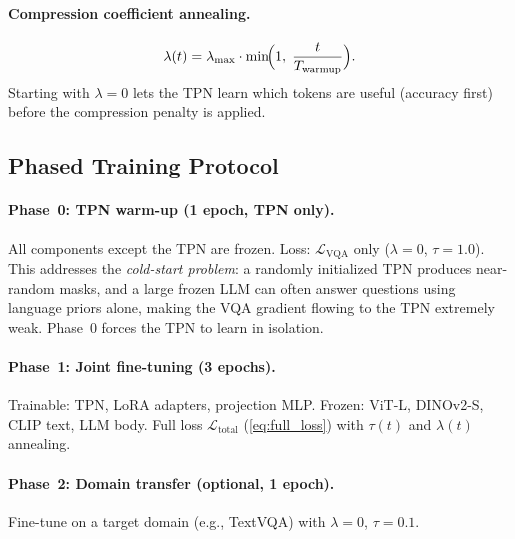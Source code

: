 \documentclass[11pt,a4paper]{article}
\begin{document}
\paragraph{Compression coefficient annealing.}
\begin{equation}
  \lambda(t) = \lambda_{\max}
    \cdot \min\!\Bigl(1,\;\frac{t}{T_{\mathrm{warmup}}}\Bigr).
  \label{eq:lambda_anneal}
\end{equation}
Starting with $\lambda{=}0$ lets the TPN learn which tokens are useful (accuracy
first) before the compression penalty is applied.

\subsection{Phased Training Protocol}
\label{subsec:phases}

\paragraph{Phase~0: TPN warm-up (1 epoch, TPN only).}
All components except the TPN are frozen. Loss: $\mathcal{L}_{\mathrm{VQA}}$
only ($\lambda{=}0$, $\tau{=}1.0$). This addresses the \emph{cold-start problem}:
a randomly initialized TPN produces near-random masks, and a large frozen LLM
can often answer questions using language priors alone, making the VQA gradient
flowing to the TPN extremely weak. Phase~0 forces the TPN to learn in isolation.

\paragraph{Phase~1: Joint fine-tuning (3 epochs).}
Trainable: TPN, LoRA adapters, projection MLP. Frozen: ViT-L, DINOv2-S, CLIP
text, LLM body. Full loss $\mathcal{L}_{\mathrm{total}}$ (\cref{eq:full_loss})
with $\tau(t)$ and $\lambda(t)$ annealing.

\paragraph{Phase~2: Domain transfer (optional, 1 epoch).}
Fine-tune on a target domain (e.g., TextVQA) with $\lambda{=}0$, $\tau{=}0.1$.
\end{document}
